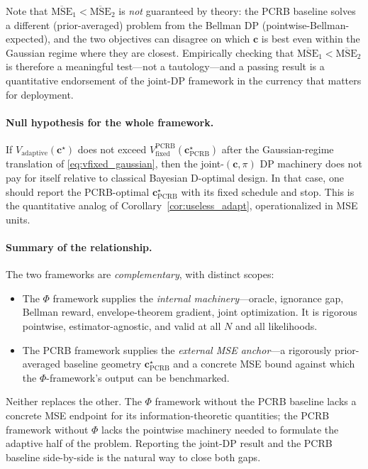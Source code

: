 \documentclass[11pt,a4paper]{article}
\begin{document}
Note that $\overline{\mathrm{MSE}}_1 < \overline{\mathrm{MSE}}_2$ is \emph{not} guaranteed by theory: the PCRB baseline solves a different (prior-averaged) problem from the Bellman DP (pointwise-Bellman-expected), and the two objectives can disagree on which $\bm{c}$ is best even within the Gaussian regime where they are closest.  Empirically checking that $\overline{\mathrm{MSE}}_1 < \overline{\mathrm{MSE}}_2$ is therefore a meaningful test---not a tautology---and a passing result is a quantitative endorsement of the joint-DP framework in the currency that matters for deployment.

\paragraph{Null hypothesis for the whole framework.}
If $V_{\mathrm{adaptive}}(\bm{c}^\star)$ does not exceed $V^{\mathrm{PCRB}}_{\mathrm{fixed}}(\bm{c}_{\mathrm{PCRB}}^\star)$ after the Gaussian-regime translation of \eqref{eq:vfixed_gaussian}, then the joint-$(\bm{c}, \pi)$ DP machinery does not pay for itself relative to classical Bayesian D-optimal design.  In that case, one should report the PCRB-optimal $\bm{c}_{\mathrm{PCRB}}^\star$ with its fixed schedule and stop.  This is the quantitative analog of Corollary~\ref{cor:useless_adapt}, operationalized in MSE units.

\paragraph{Summary of the relationship.}
The two frameworks are \emph{complementary}, with distinct scopes:

\begin{itemize}[nosep, leftmargin=2em]
  \item The $\Phi$ framework supplies the \emph{internal machinery}---oracle, ignorance gap, Bellman reward, envelope-theorem gradient, joint optimization.  It is rigorous pointwise, estimator-agnostic, and valid at all $N$ and all likelihoods.
  \item The PCRB framework supplies the \emph{external MSE anchor}---a rigorously prior-averaged baseline geometry $\bm{c}_{\mathrm{PCRB}}^\star$ and a concrete MSE bound against which the $\Phi$-framework's output can be benchmarked.
\end{itemize}

Neither replaces the other.  The $\Phi$ framework without the PCRB baseline lacks a concrete MSE endpoint for its information-theoretic quantities; the PCRB framework without $\Phi$ lacks the pointwise machinery needed to formulate the adaptive half of the problem.  Reporting the joint-DP result and the PCRB baseline side-by-side is the natural way to close both gaps.
\end{document}
